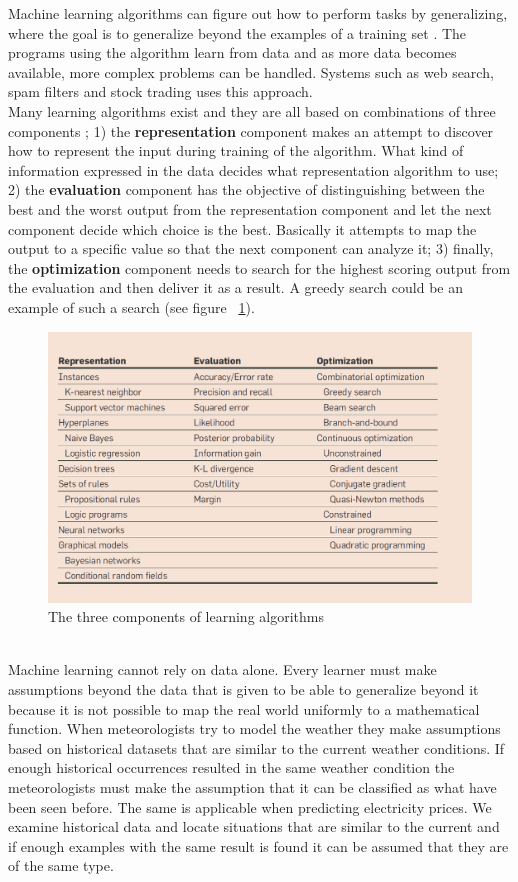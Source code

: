 Machine learning algorithms can figure out how to perform tasks by generalizing, where the goal is to generalize beyond the examples of a training set \cite{18}. The programs using the algorithm learn from data and as more data becomes available, more complex problems can be handled. Systems such as web search, spam filters and stock trading uses this approach.
\\[0.5cm]
Many learning algorithms exist and they are all based on combinations of three components \cite{18}; 1) the \textbf{representation} component makes an attempt to discover how to represent the input during training of the algorithm. What kind of information expressed in the data decides what representation algorithm to use; 2) the \textbf{evaluation} component has the objective of distinguishing between the best and the worst output from the representation component and let the next component decide which choice is the best. Basically it attempts to map the output to a specific value so that the next component can analyze it; 3) finally, the \textbf{optimization} component needs to search for the highest scoring output from the evaluation and then deliver it as a result. A greedy search could be an example of such a search (see figure ~\ref{fig:threeComponents}).
\begin{figure}[!ht]
\centering
\includegraphics[width=0.6\linewidth,natwidth=898,natheight=587]{billeder/Table1-TheComponentsOfLearningAlgorithms.png}
\caption{The three components of learning algorithms \cite{18}}
\label{fig:threeComponents}
\end{figure}
\\[0.5cm] 
Machine learning cannot rely on data alone. Every learner must make assumptions beyond the data that is given to be able to generalize beyond it \cite{18} because it is not possible to map the real world uniformly to a mathematical function. When meteorologists try to model the weather they make assumptions based on historical datasets that are similar to the current weather conditions. If enough historical occurrences resulted in the same weather condition the meteorologists must make the assumption that it can be classified as what have been seen before. The same is applicable when predicting electricity prices. We examine historical data and locate situations that are similar to the current and if enough examples with the same result is found it can be assumed that they are of the same type.
